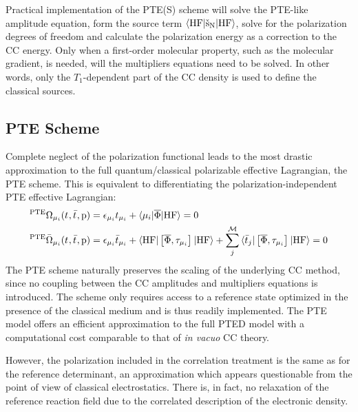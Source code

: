 Practical implementation of the \acs{PTE(S)} scheme will solve the
\acs{PTE}-like amplitude equation, form the source term
$\braket{\mathrm{HF} | \check{\mathrm{s}}_\mathrm{N} | \mathrm{HF}}$, solve for
the polarization degrees of freedom and calculate the polarization
energy as a correction to the \acs{CC} energy.
Only when a first-order molecular property, such as the molecular
gradient, is needed, will the multipliers equations need to be solved.
In other words, only the $T_1$-dependent part of the \acs{CC} density is
used to define the classical sources.

\subsection*{PTE Scheme}

Complete neglect of the polarization functional leads to the most
drastic approximation to the full quantum/classical polarizable
effective Lagrangian, the \acs{PTE} scheme.
This is equivalent to differentiating the polarization-independent
\acs{PTE} effective Lagrangian:
\begin{subequations}
  \begin{align}
 {}^{\mathrm{PTE}}\Omega_{\mu_i}(t_{}, \bar{t}_{}, \mathrm{p})  &=
   \epsilon_{\mu_i}t_{\mu_i} + \braket{\mu_i | \overline{\Phi} | \mathrm{HF}}
    = 0 \\
   {}^{\mathrm{PTE}}\bar{\Omega}_{\mu_i}(t_{}, \bar{t}_{}, \mathrm{p})
    &=
    \epsilon_{\mu_i}\bar{t}_{\mu_i} +
    \braket{\mathrm{HF} | \left[ \overline{\Phi}, \tau_{\mu_i} \right]^{} | \mathrm{HF}} +
    \sum_{j}^{\mathcal{M}}\braket{\bar{t}_{j} |
    \left[ \overline{\Phi}, \tau_{\mu_i} \right]^{} | \mathrm{HF}}
    = 0
  \end{align}
\end{subequations}
The \acs{PTE} scheme naturally preserves the scaling of the underlying
\acs{CC} method, since no coupling between the \acs{CC} amplitudes and
multipliers equations is introduced.
The scheme only requires access to a
reference state optimized in the presence of the classical medium and is
thus readily implemented.
The \acs{PTE} model offers an efficient approximation to the full
\acs{PTED} model with a computational cost comparable to that of
\emph{in vacuo} \acs{CC} theory.

However, the polarization included in the correlation treatment is the
same as for the reference determinant, an approximation which appears
questionable from the point of view of classical electrostatics. There
is, in fact, no relaxation of the reference reaction field due to the
correlated description of the electronic density.

